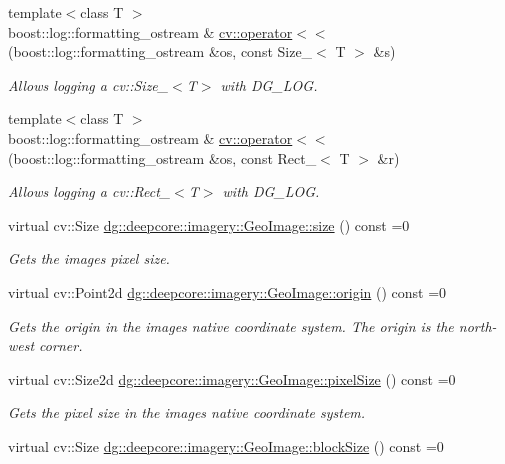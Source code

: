 \begin{DoxyCompactItemize}
{\footnotesize template$<$class T $>$ }\\boost\+::log\+::formatting\+\_\+ostream \& \hyperlink{group___imagery_module_ga0656a5315cde33b97aa201d95d1a285f}{cv\+::operator$<$$<$} (boost\+::log\+::formatting\+\_\+ostream \&os, const Size\+\_\+$<$ T $>$ \&s)
\begin{DoxyCompactList}\small\item\em Allows logging a cv\+::\+Size\+\_\+$<$\+T$>$ with D\+G\+\_\+\+L\+OG. \end{DoxyCompactList}\item 
{\footnotesize template$<$class T $>$ }\\boost\+::log\+::formatting\+\_\+ostream \& \hyperlink{group___imagery_module_gae1a3630bfbc5f81997647209bc6fcc38}{cv\+::operator$<$$<$} (boost\+::log\+::formatting\+\_\+ostream \&os, const Rect\+\_\+$<$ T $>$ \&r)
\begin{DoxyCompactList}\small\item\em Allows logging a cv\+::\+Rect\+\_\+$<$\+T$>$ with D\+G\+\_\+\+L\+OG. \end{DoxyCompactList}\item 
virtual cv\+::\+Size \hyperlink{group___imagery_module_gaac80b110347bd25c8fbdefef229d89c6}{dg\+::deepcore\+::imagery\+::\+Geo\+Image\+::size} () const =0
\begin{DoxyCompactList}\small\item\em Gets the image\textquotesingle{}s pixel size. \end{DoxyCompactList}\item 
virtual cv\+::\+Point2d \hyperlink{group___imagery_module_ga6dff2792da9db73d8d80e5841edce606}{dg\+::deepcore\+::imagery\+::\+Geo\+Image\+::origin} () const =0
\begin{DoxyCompactList}\small\item\em Gets the origin in the image\textquotesingle{}s native coordinate system. The origin is the north-\/west corner. \end{DoxyCompactList}\item 
virtual cv\+::\+Size2d \hyperlink{group___imagery_module_ga11359d5f53eff7d8ac2e661f31eb4f1a}{dg\+::deepcore\+::imagery\+::\+Geo\+Image\+::pixel\+Size} () const =0
\begin{DoxyCompactList}\small\item\em Gets the pixel size in the image\textquotesingle{}s native coordinate system. \end{DoxyCompactList}\item 
virtual cv\+::\+Size \hyperlink{group___imagery_module_ga02738a1beaa1dd55f6d06593fe9a4c6f}{dg\+::deepcore\+::imagery\+::\+Geo\+Image\+::block\+Size} () const =0

\end{DoxyCompactItemize}
